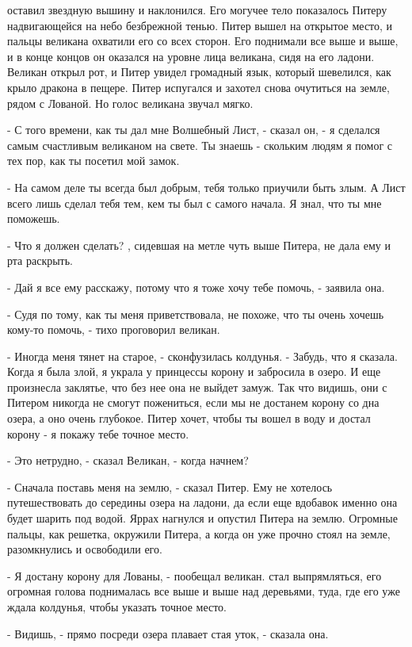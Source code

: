  оставил звездную вышину и наклонился. Его могучее тело 
показалось Питеру надвигающейся на небо безбрежной тенью. Питер вышел 
на открытое место, и пальцы великана охватили его со всех сторон. Его 
поднимали все выше и выше, и в конце концов он оказался на уровне лица 
великана, сидя на его ладони. Великан открыл рот, и Питер увидел 
громадный язык, который шевелился, как крыло дракона в пещере. Питер 
испугался и захотел снова очутиться на земле, рядом с Лованой. Но 
голос великана звучал мягко.
\par- С того времени, как ты дал мне Волшебный Лист, - сказал он, - я 
сделался самым счастливым великаном на свете. Ты знаешь - скольким 
людям я помог с тех пор, как ты посетил мой замок.
\par- На самом деле ты всегда был добрым, тебя только приучили быть 
злым. А Лист всего лишь сделал тебя тем, кем ты был с самого начала. Я 
знал, что ты мне поможешь.
\par- Что я должен сделать?
, сидевшая на метле чуть выше Питера, не дала ему и рта 
раскрыть.
\par- Дай я все ему расскажу, потому что я тоже хочу тебе помочь, - 
заявила она.
\par- Судя по тому, как ты меня приветствовала, не похоже, что ты 
очень хочешь кому-то помочь, - тихо проговорил великан.
\par- Иногда меня тянет на старое, - сконфузилась колдунья. - Забудь, 
что я сказала. Когда я была злой, я украла у принцессы корону и 
забросила в озеро. И еще произнесла заклятье, что без нее она не 
выйдет замуж. Так что видишь, они с Питером никогда не смогут 
пожениться, если мы не достанем корону со дна озера, а оно очень 
глубокое. Питер хочет, чтобы ты вошел в воду и достал корону - я 
покажу тебе точное место.
\par- Это нетрудно, - сказал Великан, - когда начнем?
\par- Сначала поставь меня на землю, - сказал Питер. Ему не хотелось 
путешествовать до середины озера на ладони, да если еще вдобавок 
именно она будет шарить под водой.
 Яррах нагнулся и опустил Питера на землю. Огромные пальцы, 
как решетка, окружили Питера, а когда он уже прочно стоял на земле, 
разомкнулись и освободили его.
\par- Я достану корону для Лованы, - пообещал великан.
 стал выпрямляться, его огромная голова поднималась все выше 
и выше над деревьями, туда, где его уже ждала колдунья, чтобы указать 
точное место.
\par- Видишь, - прямо посреди озера плавает стая уток, - сказала она. 
